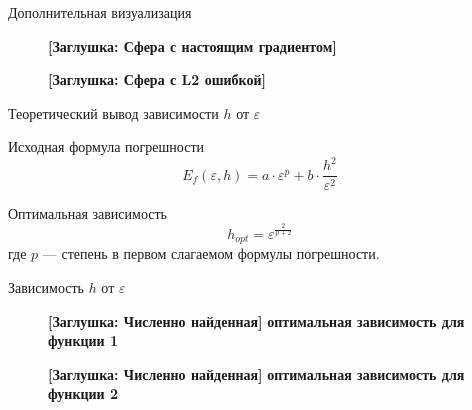 \documentclass[aspectratio=169,xcolor=dvipsnames]{beamer}
\begin{document}
\begin{frame}{Дополнительная визуализация}
    \begin{figure}
        \centering
        \begin{minipage}{0.45\textwidth}
            \centering
            \textbf{[Заглушка: Сфера с настоящим градиентом]}
            \vspace{4cm}
        \end{minipage}
        \hfill
        \begin{minipage}{0.45\textwidth}
            \centering
            \textbf{[Заглушка: Сфера с L2 ошибкой]}
            \vspace{4cm}
        \end{minipage}
    \end{figure}
\end{frame}

\begin{frame}{Теоретический вывод зависимости $h$ от $\varepsilon$}
    \begin{block}{Исходная формула погрешности}
        \[E_f(\varepsilon, h) = a \cdot \varepsilon^p + b \cdot \frac{h^2}{\varepsilon^2}\]
    \end{block}
    
    \begin{alertblock}{Оптимальная зависимость}
        \[h_{opt} = \varepsilon^{\frac{2}{p+2}}\]
        где $p$ — степень в первом слагаемом формулы погрешности.
    \end{alertblock}
\end{frame}

\begin{frame}{Зависимость $h$ от $\varepsilon$}
    \begin{figure}
        \centering
        \begin{minipage}{0.45\textwidth}
            \centering
            \textbf{[Заглушка: Численно найденная]}
            \textbf{оптимальная зависимость для функции 1}
            \vspace{3cm}
        \end{minipage}
        \hfill
        \begin{minipage}{0.45\textwidth}
            \centering
            \textbf{[Заглушка: Численно найденная]}
            \textbf{оптимальная зависимость для функции 2}
            \vspace{3cm}
        \end{minipage}
    \end{figure}
\end{frame}
\end{document}
